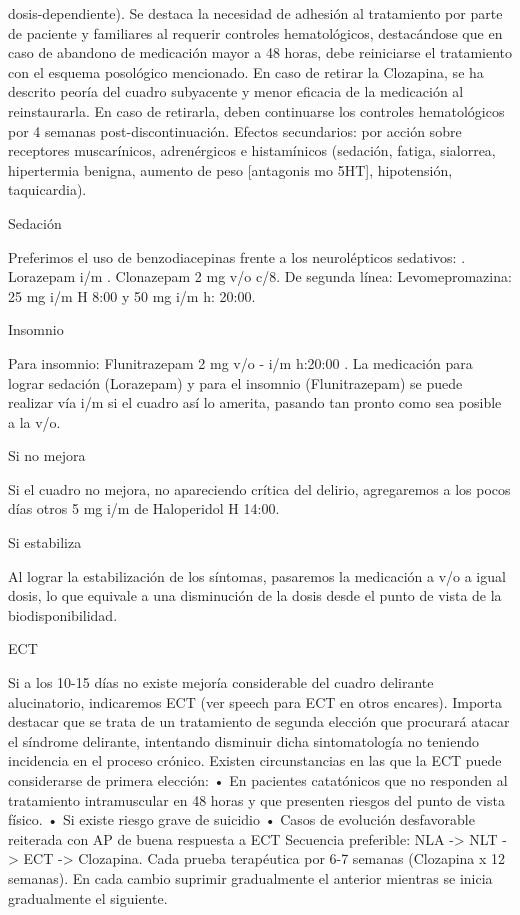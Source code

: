 dosis-dependiente). Se destaca la necesidad de adhesión al tratamiento por parte de paciente y familiares al requerir controles hematológicos, destacándose que en caso de abandono de medicación mayor a 48 horas, debe reiniciarse el tratamiento con el esquema posológico mencionado. En caso de retirar la Clozapina, se ha descrito peoría del cuadro subyacente y menor eficacia de la medicación al reinstaurarla. En caso de retirarla, deben continuarse los controles hematológicos por 4 semanas post-discontinuación. Efectos secundarios: por acción sobre receptores muscarínicos, adrenérgicos e histamínicos (sedación, fatiga, sialorrea, hipertermia benigna, aumento de peso [antagonis mo 5HT], hipotensión, taquicardia).

Sedación

Preferimos el uso de benzodiacepinas frente a los neurolépticos sedativos: . Lorazepam i/m . Clonazepam 2 mg v/o c/8. De segunda línea: Levomepromazina: 25 mg i/m H 8:00 y 50 mg i/m h: 20:00.

Insomnio

Para insomnio: Flunitrazepam 2 mg v/o - i/m h:20:00 . La medicación para lograr sedación (Lorazepam) y para el insomnio (Flunitrazepam) se puede realizar vía i/m si el cuadro así lo amerita, pasando tan pronto como sea posible a la v/o.

Si no mejora

Si el cuadro no mejora, no apareciendo crítica del delirio, agregaremos a los pocos días otros 5 mg i/m de Haloperidol H 14:00.

Si estabiliza

Al lograr la estabilización de los síntomas, pasaremos la medicación a v/o a igual dosis, lo que equivale a una disminución de la dosis desde el punto de vista de la biodisponibilidad.

ECT

Si a los 10-15 días no existe mejoría considerable del cuadro delirante alucinatorio, indicaremos ECT (ver speech para ECT en otros encares). Importa destacar que se trata de un tratamiento de segunda elección que procurará atacar el síndrome delirante, intentando disminuir dicha sintomatología no teniendo incidencia en el proceso crónico. Existen circunstancias en las que la ECT puede considerarse de primera elección: • En pacientes catatónicos que no responden al tratamiento intramuscular en 48 horas y que presenten riesgos del punto de vista físico. • Si existe riesgo grave de suicidio • Casos de evolución desfavorable reiterada con AP de buena respuesta a ECT Secuencia preferible: NLA -> NLT -> ECT -> Clozapina. Cada prueba terapéutica por 6-7 semanas (Clozapina x 12 semanas). En cada cambio suprimir gradualmente el anterior mientras se inicia gradualmente el siguiente.

